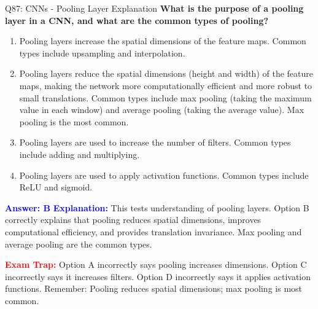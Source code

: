 \documentclass[8pt]{beamer}
\begin{document}
	\begin{frame}{Q87: CNNs - Pooling Layer Explanation}
		\fontsize{6.5}{7.5}\selectfont
		\textbf{What is the purpose of a pooling layer in a CNN, and what are the common types of pooling?}
		
		\begin{enumerate}
			\item Pooling layers increase the spatial dimensions of the feature maps. Common types include upsampling and interpolation.
			\item Pooling layers reduce the spatial dimensions (height and width) of the feature maps, making the network more computationally efficient and more robust to small translations. Common types include max pooling (taking the maximum value in each window) and average pooling (taking the average value). Max pooling is the most common.
			\item Pooling layers are used to increase the number of filters. Common types include adding and multiplying.
			\item Pooling layers are used to apply activation functions. Common types include ReLU and sigmoid.
		\end{enumerate}
		
		\vspace{0.1cm}
		\textcolor{blue}{\textbf{Answer: B}}
		\vspace{0.1cm}
		\textcolor{blue}{\textbf{Explanation:}} This tests understanding of pooling layers. Option B correctly explains that pooling reduces spatial dimensions, improves computational efficiency, and provides translation invariance. Max pooling and average pooling are the common types.
		
		\textcolor{red}{\textbf{Exam Trap:}} Option A incorrectly says pooling increases dimensions. Option C incorrectly says it increases filters. Option D incorrectly says it applies activation functions. Remember: Pooling reduces spatial dimensions; max pooling is most common.
	\end{frame}
	
\end{document}
